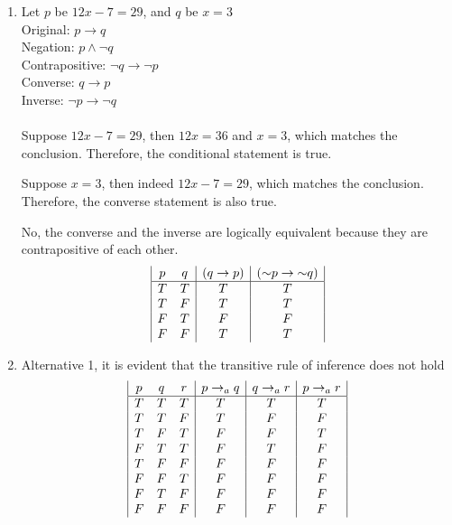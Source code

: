 \documentclass[12pt, a4paper]{article}
\begin{document}
\begin{enumerate}[Q\arabic*.]
  \vfill
\item Let $p$ be $12x - 7 = 29$, and $q$ be $x = 3$ \\
  Original: $p \rightarrow q$ \\
  Negation: $p \land \neg q$ \\
  Contrapositive: $\neg q \rightarrow \neg p$ \\
  Converse: $q \rightarrow p$ \\
  Inverse: $\neg p \rightarrow \neg q$ \\
  \hfill\\
  Suppose $12x - 7 = 29$, then $12x = 36$ and $x = 3$, which matches the conclusion. Therefore, the conditional statement is true.

  Suppose $x = 3$, then indeed $12x - 7 = 29$, which matches the conclusion. Therefore, the converse statement is also true.

  No, the converse and the inverse are logically equivalent because they are contrapositive of each other.
  \begin{displaymath}
    \begin{array}{|c c|c|c|}
      p & q & (q \rightarrow p) & (\neg p \rightarrow \neg q)\\ %
      \hline %
      T & T & T & T\\
      T & F & T & T\\
      F & T & F & F\\
      F & F & T & T\\
    \end{array}
  \end{displaymath}

\item Alternative 1, it is evident that the transitive rule of inference does not hold
  \begin{displaymath}
    \begin{array}{|c c c|c|c|c|}
      p & q & r & p \rightarrow_a q & q \rightarrow_a r & p \rightarrow_a r\\ %
      \hline %
      T & T & T & T & T & T\\
      T & T & F & T & F & F\\
      T & F & T & F & F & T\\
      F & T & T & F & T & F\\
      T & F & F & F & F & F\\
      F & F & T & F & F & F\\
      F & T & F & F & F & F\\
      F & F & F & F & F & F\\
    \end{array}
  \end{displaymath}


\end{enumerate}
\end{document}
